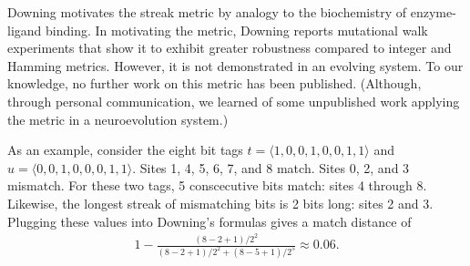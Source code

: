 Downing motivates the streak metric by analogy to the biochemistry of enzyme-ligand binding.
In motivating the metric, Downing reports mutational walk experiments that show it to exhibit greater robustness compared to integer and Hamming metrics.
However, it is not demonstrated in an evolving system.
To our knowledge, no further work on this metric has been published.
(Although, through personal communication, we learned of some unpublished work applying the metric in a neuroevolution system.)

As an example, consider the eight bit tags $t = \langle 1, 0, 0, 1, 0, 0, 1, 1 \rangle$ and $u = \langle 0, 0, 1, 0, 0, 0, 1, 1 \rangle$.
Sites 1, 4, 5, 6, 7, and 8 match.
Sites 0, 2, and 3 mismatch.
For these two tags, 5 conscecutive bits match: sites 4 through 8.
Likewise, the longest streak of mismatching bits is 2 bits long: sites 2 and 3.
Plugging these values into Downing's formulas gives a match distance of
\begin{align*}
1 - \frac{
  (8 - 2 + 1) / 2^2
}{
  (8 - 2 + 1) / 2^2
  + (8 - 5 + 1) / 2^5
} \approx 0.06.
\end{align*}
